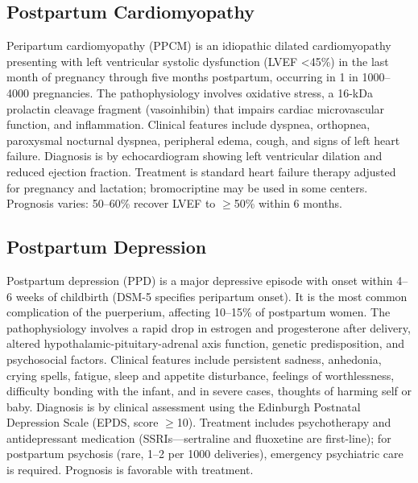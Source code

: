 \subsection{Postpartum Cardiomyopathy}
\label{sec:Postpartum Cardiomyopathy}
Peripartum cardiomyopathy (PPCM) is an idiopathic dilated cardiomyopathy presenting with left ventricular systolic dysfunction (LVEF <45\%) in the last month of pregnancy through five months postpartum, occurring in 1 in 1000--4000 pregnancies. The pathophysiology involves oxidative stress, a 16-kDa prolactin cleavage fragment (vasoinhibin) that impairs cardiac microvascular function, and inflammation. Clinical features include dyspnea, orthopnea, paroxysmal nocturnal dyspnea, peripheral edema, cough, and signs of left heart failure. Diagnosis is by echocardiogram showing left ventricular dilation and reduced ejection fraction. Treatment is standard heart failure therapy adjusted for pregnancy and lactation; bromocriptine may be used in some centers. Prognosis varies: 50--60\% recover LVEF to $\ge$50\% within 6 months.

\subsection{Postpartum Depression}
\label{sec:Postpartum Depression}
Postpartum depression (PPD) is a major depressive episode with onset within 4--6 weeks of childbirth (DSM-5 specifies peripartum onset). It is the most common complication of the puerperium, affecting 10--15\% of postpartum women. The pathophysiology involves a rapid drop in estrogen and progesterone after delivery, altered hypothalamic-pituitary-adrenal axis function, genetic predisposition, and psychosocial factors. Clinical features include persistent sadness, anhedonia, crying spells, fatigue, sleep and appetite disturbance, feelings of worthlessness, difficulty bonding with the infant, and in severe cases, thoughts of harming self or baby. Diagnosis is by clinical assessment using the Edinburgh Postnatal Depression Scale (EPDS, score $\ge$10). Treatment includes psychotherapy and antidepressant medication (SSRIs---sertraline and fluoxetine are first-line); for postpartum psychosis (rare, 1--2 per 1000 deliveries), emergency psychiatric care is required. Prognosis is favorable with treatment.

